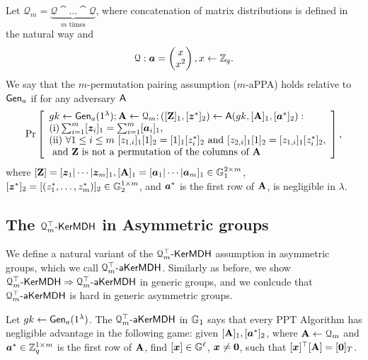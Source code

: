 \begin{definition}
Let $\mathcal{Q}_{m}=\underbrace{\mathcal{Q}\cat\ldots\cat\mathcal{Q}}_{m\text{ times}}$, where concatenation of matrix distributions is defined in the natural way and 
$$\mathcal{Q}: {\boldsymbol{a}}=\left(\begin{matrix}x\\x^2\end{matrix}\right), x\gets\mathbb{Z}_q.$$
We say that the $m$-permutation pairing assumption ($m$-aPPA) holds relative to $\mathsf{Gen}_a$ if for any adversary $\mathsf{A}$
$$
\Pr\left[
\begin{array}{l}
	gk\gets\G_a(1^\lambda);\matr{A}\gets\mathcal{Q}_{m};([\matr{Z}]_1,[\vecb{z}^*]_2)\gets\advA(gk,[\matr{A}]_1,[\vecb{a}^*]_2):\\
	\mathrm{(i)} \sum_{i=1}^{m}[\vecb{z}_i]_1 = \sum_{i=1}^{m}[\vecb{a}_i]_1,\\
	\mathrm{(ii)}\ \forall 1\leq i\leq m\ [z_{1,i}]_1[1]_2=[1]_1[z^*_{i}]_2 \text{ and } [z_{2,i}]_1[1]_2=[z_{1,i}]_1[z^*_{i}]_2,\\
	\text{ and }\matr{Z}\text{ is not a permutation of the columns of }\matr{A}
\end{array}
\right],
$$
where $[\mathbf{{Z}}]=[{\boldsymbol{z}}_1|\cdots|{\boldsymbol{z}}_m]_1, [\mathbf{{A}}]_1=[{\boldsymbol{a}}_1|\cdots|{\boldsymbol{a}}_m]_1\in\mathbb{G}_1^{2\times m}$, $[{\boldsymbol{z}}^*]_2=\allowbreak[(z^*_1,\ldots,\allowbreak z^*_m)]_2\in\mathbb{G}_2^{1\times m}$, and ${\boldsymbol{a}}^*$ is the first row of $\mathbf{{A}}$, is negligible in $\lambda$.
\end{definition}

\subsection{The $\mathcal{Q}_m^\top\mbox{-}\mathsf{KerMDH}$ in Asymmetric groups}
We define a natural variant of the $\mathcal{Q}_m^\top\mbox{-}\mathsf{KerMDH}$ assumption in asymmetric groups, which we call $\mathcal{Q}_m^\top\mbox{-}\mathsf{aKerMDH}$. Similarly as before, we show $\mathcal{Q}_m^\top\mbox{-}\mathsf{KerMDH}\Rightarrow \mathcal{Q}_m^\top\mbox{-}\mathsf{aKerMDH}$ in generic groups, and we conlcude that $\mathcal{Q}_m^\top\mbox{-}\mathsf{aKerMDH}$ is hard in generic asymmetric groups. 

\begin{definition}
Let  ${gk} \gets\mathsf{Gen}_a(1^\lambda)$.
The $\mathcal{Q}_m^\top\mbox{-}\mathsf{aKerMDH}$ in $\mathbb{G}_1$ says that every PPT Algorithm has negligible advantage in the following  game: given $[\mathbf{{A}}]_1,[{\boldsymbol{a}}^*]_2$, where $\mathbf{{A}} \gets \mathcal{Q}_m$ and ${\boldsymbol{a}}^*\in\mathbb{Z}_q^{1\times m}$ is the first row of $\mathbf{{A}}$, find $[{\boldsymbol{x}}] \in \mathbb{G}^{\ell}$, ${\boldsymbol{x}} \neq {\boldsymbol{0}}$, such that 
$[{\boldsymbol{x}}]^{\top}[\mathbf{{A}}]=[{\boldsymbol{0}}]_T$. 
\end{definition}

